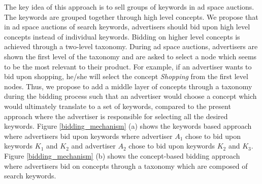 The key idea of this approach is to sell groups of keywords in ad space auctions. The keywords are grouped together through high level concepts. We propose that in ad space auctions of search keywords, advertisers should bid upon high level concepts instead of individual keywords. Bidding on higher level concepts is achieved through a two-level taxonomy. During ad space auctions, advertisers are shown the first level of the taxonomy and are asked to select a node which seems to be the most relevant to their product. For example, if an advertiser wants to bid upon shopping, he/she will select the concept \textit{Shopping} from the first level nodes. Thus, we propose to add a middle layer of concepts through a taxonomy during the bidding process such that an advertiser would choose a concept which would ultimately translate to a set of keywords, compared to the present approach where the advertiser is responsible for selecting all the desired keywords. Figure \ref{bidding_mechanism} (a) shows the keywords based approach where advertisers bid upon keywords where advertiser $A_1$ chose to bid upon keywords $K_1$ and $K_2$ and advertiser $A_2$ chose to bid upon keywords $K_2$ and $K_3$. Figure \ref{bidding_mechanism} (b) shows the concept-based bidding approach where advertisers bid on concepts through a taxonomy which are composed of search keywords.

